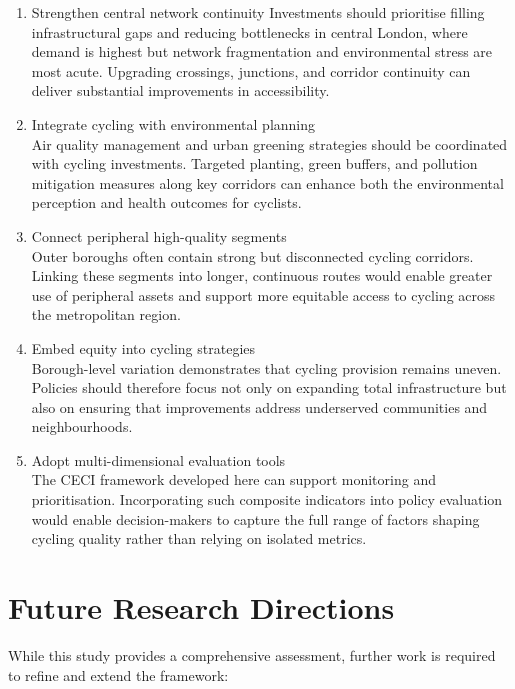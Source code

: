 \documentclass[
  12pt,
  oneside]{book}
\begin{document}
\begin{enumerate}
\def\labelenumi{\arabic{enumi}.}
\item
  Strengthen central network continuity
  Investments should prioritise filling infrastructural gaps and reducing bottlenecks in central London, where demand is highest but network fragmentation and environmental stress are most acute. Upgrading crossings, junctions, and corridor continuity can deliver substantial improvements in accessibility.
\item
  Integrate cycling with environmental planning\\
  Air quality management and urban greening strategies should be coordinated with cycling investments. Targeted planting, green buffers, and pollution mitigation measures along key corridors can enhance both the environmental perception and health outcomes for cyclists.
\item
  Connect peripheral high-quality segments\\
  Outer boroughs often contain strong but disconnected cycling corridors. Linking these segments into longer, continuous routes would enable greater use of peripheral assets and support more equitable access to cycling across the metropolitan region.
\item
  Embed equity into cycling strategies\\
  Borough-level variation demonstrates that cycling provision remains uneven. Policies should therefore focus not only on expanding total infrastructure but also on ensuring that improvements address underserved communities and neighbourhoods.
\item
  Adopt multi-dimensional evaluation tools\\
  The CECI framework developed here can support monitoring and prioritisation. Incorporating such composite indicators into policy evaluation would enable decision-makers to capture the full range of factors shaping cycling quality rather than relying on isolated metrics.
\end{enumerate}

\section{Future Research Directions}\label{future-research-directions}

While this study provides a comprehensive assessment, further work is required to refine and extend the framework:
\end{document}
